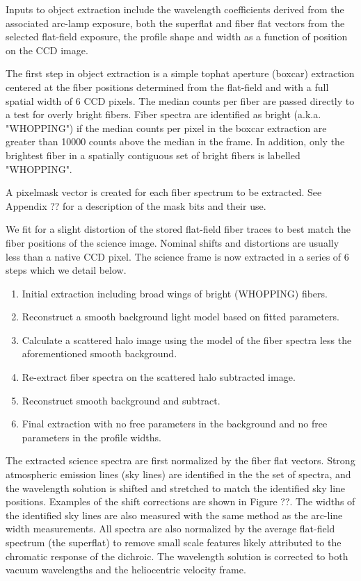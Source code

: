 \documentclass[12pt,preprint]{aastex}
\begin{document}
Inputs to object extraction include the wavelength coefficients derived
from the associated arc-lamp exposure, both the superflat and fiber flat
vectors from the selected flat-field exposure, the profile shape and width
as a function of position on the CCD image.

The first step in object extraction is a simple tophat aperture (boxcar) 
extraction centered at the fiber positions determined from the flat-field 
and with a full spatial width of 6 CCD pixels.  The median counts per fiber 
are passed directly to a test for overly bright fibers. Fiber spectra are 
identified as bright (a.k.a. "WHOPPING") if the median counts per pixel in the 
boxcar extraction are greater than 10000 counts above the median in the 
frame.  In addition, only the brightest fiber in a spatially contiguous set of 
bright fibers is labelled "WHOPPING".  

A pixelmask vector is created for each fiber spectrum to be extracted.
See Appendix ?? for a description of the mask bits and their use.

We fit for a slight distortion of the stored flat-field fiber traces to 
best match the fiber positions of the science image.  Nominal shifts and
distortions are usually less than a native CCD pixel.  The science frame
is now extracted in a series of 6 steps which we detail below.

\begin{enumerate}
\item{Initial extraction including broad wings of bright (WHOPPING) fibers.}
\item{Reconstruct a smooth background light model based on fitted parameters.}
\item{Calculate a scattered halo image using the model of the fiber spectra less
the aforementioned smooth background.}
\item{Re-extract fiber spectra on the scattered halo subtracted image.}
\item{Reconstruct smooth background and subtract.}
\item{Final extraction with no free parameters in the background and
no free parameters in the profile widths.}
\end{enumerate}

The extracted science spectra are first normalized by the fiber flat vectors.
Strong atmospheric emission lines (sky lines) are identified in the the 
set of spectra, and the wavelength solution is shifted and stretched 
to match the identified sky line positions.  
Examples of the shift corrections are shown in Figure ??.  
The widths of the identified sky lines are also measured with the same method
as the arc-line width measurements.  All spectra are also normalized by
the average flat-field spectrum (the superflat) to remove small scale
features likely attributed to the chromatic response of the dichroic.
The wavelength solution is corrected to both vacuum wavelengths and the
heliocentric velocity frame.
\end{document}
